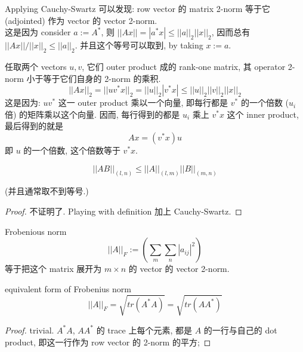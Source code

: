 \documentclass[lang=cn,11pt]{elegantbook}
\begin{document}
\begin{example}
    Applying Cauchy-Swartz 可以发现: row vector 的 matrix 2-norm 等于它 (adjointed) 作为 vector 的 vector 2-norm.\\
    这是因为 consider $a := A^*$, 则 
    $||Ax|| = |a^* x| \leq ||a||_2 ||x||_2$, 因而总有 $||Ax|| / ||x||_2 \leq ||a||_2$. 并且这个等号可以取到, by taking $x := a$.
\end{example}



\begin{example}

    任取两个 vectors $u,v$, 它们 outer product 成的 rank-one matrix, 其 operator 2-norm 小于等于它们自身的 2-norm 的乘积.\\
    $$
    ||Ax||_2  = ||uv^* x||_2 = ||u||_2 |v^*x| \leq ||u||_2 ||v||_2 ||x||_2
    $$
    这是因为: $u  v^*$ 这一 outer product 乘以一个向量, 即每行都是 $v^*$ 的一个倍数 ($u_i$ 倍) 的矩阵乘以这个向量. 因而, 每行得到的都是 $u_i$ 乘上 $v^* x$ 这个 inner product, 最后得到的就是
    $$
    Ax = (v^*x) u
    $$
    即 $u$ 的一个倍数, 这个倍数等于 $v^* x$. 
\end{example}


\begin{example}
\begin{theorem}
\begin{equation}
    ||AB||_{(l,n)} \leq ||A||_{(l,m)} ||B||_{(m,n)}
\end{equation}
\end{theorem}
(并且通常取不到等号.)
\begin{proof}
    不证明了. Playing with definition 加上 Cauchy-Swartz.
\end{proof}
\end{example}


\begin{definition}{Frobenious norm}
    $$
    ||A||_F := (\sum_m \sum_n |a_{ij}|^2)
    $$
    等于把这个 matrix 展开为 $m\times n$ 的 vector 的 vector 2-norm.
\end{definition}


\begin{theorem}{equivalent form of Frobenius norm}
    \begin{equation}
        ||A||_F = \sqrt{tr(A^*A)} = \sqrt{tr(AA^*)}
    \end{equation}
\end{theorem}
\begin{proof}
    trivial. $A^*A$, $AA^*$ 的 trace 上每个元素, 都是 $A$ 的一行与自己的 dot product, 即这一行作为 row vector 的 2-norm 的平方; 
\end{proof}
\end{document}
